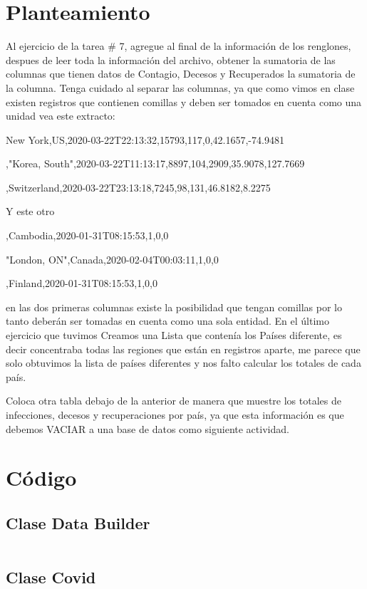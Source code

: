 \documentclass[12pt]{article}
\author{Pablo Vargas Bermúdez}
\begin{document}
\pagestyle{empty}


\section*{Planteamiento}
Al ejercicio de la tarea \# 7, agregue al final de la información de
los renglones, despues de leer toda la información del archivo,
obtener la sumatoria de las columnas que tienen datos de Contagio,
Decesos y Recuperados la sumatoria de la columna. Tenga cuidado al
separar las columnas, ya que como vimos en clase existen registros que
contienen comillas y deben ser tomados en cuenta como una unidad vea
este extracto:

New York,US,2020-03-22T22:13:32,15793,117,0,42.1657,-74.9481

,"Korea, South",2020-03-22T11:13:17,8897,104,2909,35.9078,127.7669

,Switzerland,2020-03-22T23:13:18,7245,98,131,46.8182,8.2275

Y este otro

,Cambodia,2020-01-31T08:15:53,1,0,0

"London, ON",Canada,2020-02-04T00:03:11,1,0,0

,Finland,2020-01-31T08:15:53,1,0,0

en las dos primeras columnas existe la posibilidad que tengan comillas
por lo tanto deberán ser tomadas en cuenta como una sola entidad. En
el último ejercicio que tuvimos Creamos una Lista que contenía los
Países diferente, es decir concentraba todas las regiones que están en
registros aparte, me parece que solo obtuvimos la lista de países
diferentes y nos falto calcular los totales de cada país.

Coloca otra tabla debajo de la anterior de manera que muestre los
totales de infecciones, decesos y recuperaciones por país, ya que esta
información es que debemos VACIAR a una base de datos como siguiente
actividad.

\section*{Código}
\subsection*{Clase Data Builder}
\inputminted{Java}{DataBuilder.java}

\subsection*{Clase Covid}
\inputminted{Java}{Covid.java}
\end{document}
